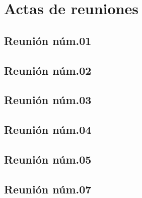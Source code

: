 \documentclass[10pt,spanish]{article}
\let\stdsection\section
\renewcommand\section{\newpage\stdsection}
\begin{document}

\section{Actas de reuniones}


\subsection{Reunión núm.01}


\subsection{Reunión núm.02}


\subsection{Reunión núm.03}


\subsection{Reunión núm.04}


\subsection{Reunión núm.05}


%

\subsection{Reunión núm.07}

\end{document}
